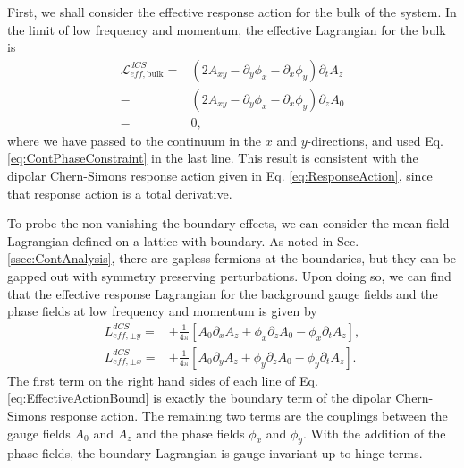\documentclass[prb,aps,twocolumn,groupaddress,floatfix]{revtex4-1}
\begin{document}
First, we shall consider the effective response action for the bulk of the system. In the limit of low frequency and momentum, the effective Lagrangian for the bulk is
\begin{equation}
\begin{split}
\mathcal{L}^{dCS}_{eff, \text{bulk}} =&  (2A_{xy} -  \partial_y \phi_x - \partial_x \phi_y  ) \partial_t A_z\\ -& (2A_{xy} -  \partial_y \phi_x - \partial_x \phi_y  ) \partial_z A_0\\
=& 0,
\end{split}\label{eq:EffectiveActionBulk}
\end{equation}
where we have passed to the continuum in the $x$ and $y$-directions, and used  Eq. \ref{eq:ContPhaseConstraint} in the last line. This result is consistent with the dipolar Chern-Simons response action given in Eq. \ref{eq:ResponseAction}, since that response action is a total derivative. 


To probe the non-vanishing the boundary effects, we can consider the mean field Lagrangian defined on a lattice with boundary. As noted in Sec. \ref{ssec:ContAnalysis}, there are gapless fermions at the boundaries, but they can be gapped out with symmetry preserving perturbations. Upon doing so, we can find that the effective response Lagrangian for the background gauge fields and the phase fields at low frequency and momentum is given by
\begin{equation}
\begin{split}
L^{dCS}_{eff,\pm y} = &\pm \frac{1}{4\pi} [A_0\partial_x A_z +\phi_x\partial_zA_0  - \phi_x \partial_tA_z ], \\
L^{dCS}_{eff,\pm x} = &\pm \frac{1}{4\pi} [A_0\partial_y A_z + \phi_y \partial_zA_0  - \phi_y\partial_tA_z ].
\end{split}\label{eq:EffectiveActionBound}
\end{equation}
The first term on the right hand sides of each line of Eq. \ref{eq:EffectiveActionBound} is exactly the boundary term of the dipolar Chern-Simons response action. The remaining two terms are the couplings between the gauge fields $A_0$ and $A_z$ and the phase fields $\phi_x$ and $\phi_y$. With the addition of the phase fields, the boundary Lagrangian is gauge invariant up to hinge terms. 
\end{document}
